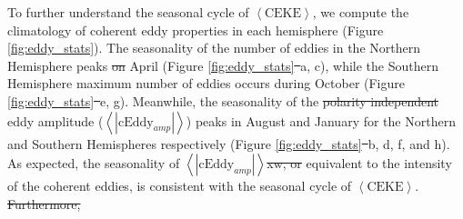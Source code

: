 \documentclass[draft,linenumbers]{agujournal2019}
\newcommand{\CEKE}{\textrm{CEKE}}
\newcommand{\cEddy}{\textrm{cEddy}}
\providecommand{\DIFadd}[1]{{\protect\color{blue}\uwave{#1}}} %
\providecommand{\DIFdel}[1]{{\protect\color{red}\sout{#1}}}                      %
\providecommand{\DIFaddbegin}{} %
\providecommand{\DIFaddend}{} %
\providecommand{\DIFdelbegin}{} %
\providecommand{\DIFdelend}{} %
\begin{document}



	To further understand the seasonal cycle of $\left<\CEKE\right>$, we compute the climatology of coherent eddy properties in each hemisphere (Figure \ref{fig:eddy_stats}). 
	The seasonality of the number of eddies in the Northern Hemisphere peaks \DIFdelbegin \DIFdel{on }\DIFdelend \DIFaddbegin \DIFadd{in }\DIFaddend April (Figure \ref{fig:eddy_stats}\DIFdelbegin \DIFdel{~}\DIFdelend a, c), while the Southern Hemisphere maximum number of eddies occurs during October (Figure \ref{fig:eddy_stats}\DIFdelbegin \DIFdel{~}\DIFdelend e, g). 
	Meanwhile, the seasonality of the \DIFdelbegin \DIFdel{polarity independent }\DIFdelend eddy amplitude ($\left<|\cEddy_{amp}|\right>$) peaks in August and January for the Northern and Southern Hemispheres respectively (Figure \ref{fig:eddy_stats}\DIFdelbegin \DIFdel{~}\DIFdelend b, d, f, and h). 
	As expected, the seasonality of $\left<|\cEddy_{amp}|\right>$\DIFdelbegin \DIFdel{xw, or }\DIFdelend \DIFaddbegin \DIFadd{, }\DIFaddend equivalent to the intensity of the coherent eddies, is consistent with the seasonal cycle of $\left<\CEKE\right>$.
\DIFdelbegin \DIFdel{Furthermore, }\DIFdelend \DIFaddbegin 
\end{document}
